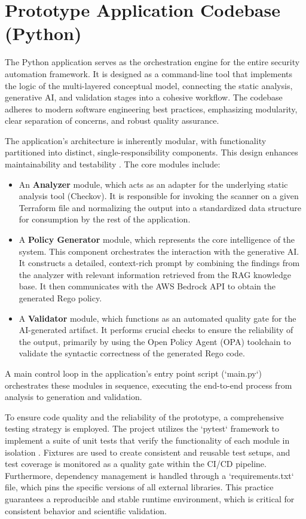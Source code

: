 \section{Prototype Application Codebase (Python)}

The Python application serves as the orchestration engine for the entire security automation framework. It is designed as a command-line tool that implements the logic of the multi-layered conceptual model, connecting the static analysis, generative AI, and validation stages into a cohesive workflow. The codebase adheres to modern software engineering best practices, emphasizing modularity, clear separation of concerns, and robust quality assurance.

The application's architecture is inherently modular, with functionality partitioned into distinct, single-responsibility components. This design enhances maintainability and testability \cite{martin_clean_2009}. The core modules include:

\begin{itemize}
    \item An \textbf{Analyzer} module, which acts as an adapter for the underlying static analysis tool (Checkov). It is responsible for invoking the scanner on a given Terraform file and normalizing the output into a standardized data structure for consumption by the rest of the application.
    \item A \textbf{Policy Generator} module, which represents the core intelligence of the system. This component orchestrates the interaction with the generative AI. It constructs a detailed, context-rich prompt by combining the findings from the analyzer with relevant information retrieved from the RAG knowledge base. It then communicates with the AWS Bedrock API to obtain the generated Rego policy.
    \item A \textbf{Validator} module, which functions as an automated quality gate for the AI-generated artifact. It performs crucial checks to ensure the reliability of the output, primarily by using the Open Policy Agent (OPA) toolchain to validate the syntactic correctness of the generated Rego code.
\end{itemize}

A main control loop in the application's entry point script (`main.py`) orchestrates these modules in sequence, executing the end-to-end process from analysis to generation and validation.

To ensure code quality and the reliability of the prototype, a comprehensive testing strategy is employed. The project utilizes the `pytest` framework to implement a suite of unit tests that verify the functionality of each module in isolation \cite{noauthor_pytest_nodate}. Fixtures are used to create consistent and reusable test setups, and test coverage is monitored as a quality gate within the CI/CD pipeline. Furthermore, dependency management is handled through a `requirements.txt` file, which pins the specific versions of all external libraries. This practice guarantees a reproducible and stable runtime environment, which is critical for consistent behavior and scientific validation.

